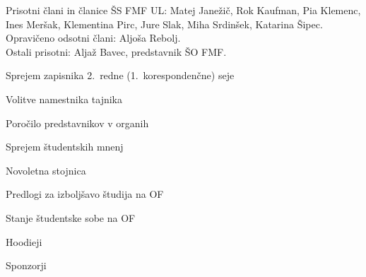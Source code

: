 \documentclass{seja}
\begin{document}
Prisotni člani in članice ŠS FMF UL:
Matej Janežič,
Rok Kaufman,
Pia Klemenc,
Ines Meršak,
Klementina Pirc,
Jure Slak,
Miha Srdinšek,
Katarina Šipec.
\\
Opravičeno odsotni člani: Aljoša Rebolj.
\\
Ostali prisotni: Aljaž Bavec, predstavnik ŠO FMF.

\begin{red*}
  \item Sprejem zapisnika 2.~redne (1.~korespondenčne) seje
  \item Volitve namestnika tajnika
  \item Poročilo predstavnikov v organih
    \item Sprejem študentskih mnenj
    \item Novoletna stojnica
    \item Predlogi za izboljšavo študija na OF
    \item Stanje študentske sobe na OF
    \item Hoodieji
    \item Sponzorji
\end{red*}
\end{document}
